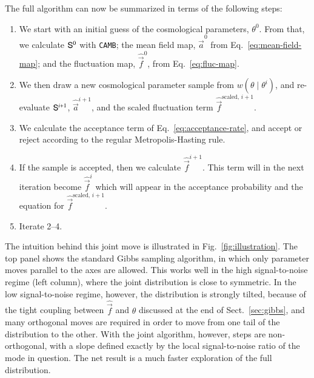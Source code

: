 \documentclass[twocolumn]{../common/aa}
\def\camb{\texttt{CAMB}}
\renewcommand{\a}[0]{\vec{a}}
\newcommand{\f}[0]{\vec{f}}
\renewcommand{\S}[0]{\tens{S}}
\begin{document}
The full algorithm can now be summarized in terms of the following steps:
\begin{enumerate}
    \item We start with an initial guess of the cosmological parameters, $\theta^0$. From that, we calculate $\S^0$ with \camb; the mean field map, $\hat{\a}^0$ from Eq.~\eqref{eq:mean-field-map}; and the fluctuation map, $\hat{\f}^0$, from Eq.~\eqref{eq:fluc-map}.
    \item We then draw a new cosmological parameter sample from $w(\theta\mid\theta^i)$, and re-evaluate $\S^{i+1}$, $\hat{\a}^{i+1}$, and the scaled fluctuation term $\hat{\f}^{\textrm{scaled},\, i+1}$.
    \item We calculate the acceptance term of Eq.~\eqref{eq:acceptance-rate}, and accept or reject according to the regular Metropolis-Hasting rule.
    \item If the sample is accepted, then we calculate $\hat{\f}^{i+1}$. This term will in the next iteration become $\hat{\f}^{i}$ which will appear in the acceptance probability and the equation for $\hat{\f}^{\textrm{scaled},\, i+1}$. 
    \item Iterate 2--4.
\end{enumerate}

The intuition behind this joint move is illustrated in Fig.~\ref{fig:illustration}. The top panel shows the standard Gibbs sampling algorithm, in which only parameter moves parallel to the axes are allowed. This works well in the high signal-to-noise regime (left column), where the joint distribution is close to symmetric. In the low signal-to-noise regime, however, the distribution is strongly tilted, because of the tight coupling between $\hat{\f}$ and $\theta$ discussed at the end of Sect.~\ref{sec:gibbs}, and many orthogonal moves are required in order to move from one tail of the distribution to the other. With the joint algorithm, however, steps are non-orthogonal, with a slope defined exactly by the local signal-to-noise ratio of the mode in question. The net result is a much faster exploration of the full distribution.
\end{document}
